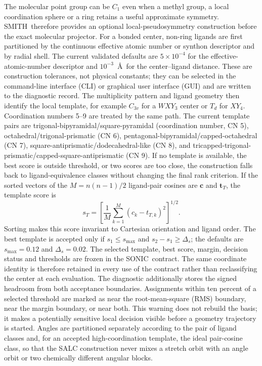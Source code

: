 \documentclass[journal=jctcce,manuscript=article,layout=traditional]{achemso}
\newcommand{\SONIC}{SONIC}
\newcommand{\SMITH}{\textsc{SMITH}}
\theoremstyle{definition}
\begin{document}
The molecular point group can be \(C_1\) even when a methyl group, a local
coordination sphere or a ring retains a useful approximate symmetry.  \SMITH\
therefore provides an optional local-pseudosymmetry construction before the
exact molecular projector.  For a bonded center, non-ring ligands are first
partitioned by the continuous effective atomic number or synthon descriptor
and by radial shell.  The current validated defaults are
\(5\times10^{-4}\) for the effective-atomic-number descriptor and
\(10^{-3}\)~\AA\ for the center--ligand distance.  These are construction
tolerances, not physical constants; they can be selected in the command-line
interface (CLI) or graphical user interface (GUI) and
are written to the diagnostic record.
The multiplicity pattern and ligand geometry then identify the local template,
for example \(C_{3v}\) for a \(WXY_3\) center or \(T_d\) for \(XY_4\).
Coordination numbers 5--9 are treated by the same path.  The current template
pairs are trigonal-bipyramidal/square-pyramidal (coordination number, CN 5),
octahedral/trigonal-prismatic (CN 6), pentagonal-bipyramidal/capped-octahedral
(CN 7), square-antiprismatic/dodecahedral-like (CN 8), and
tricapped-trigonal-prismatic/capped-square-antiprismatic (CN 9).  If no
template is available, the best score is outside threshold, or two scores are
too close, the construction falls back to ligand-equivalence classes without
changing the final rank criterion.  If the sorted vectors of the
\(M=n(n-1)/2\) ligand-pair cosines are \(\mathbf c\) and
\(\mathbf t_T\), the template score is
\begin{equation}
 s_T=\left[\frac{1}{M}\sum_{k=1}^{M}(c_k-t_{T,k})^2\right]^{1/2}.
 \label{eq:local-template-score}
\end{equation}
Sorting makes this score invariant to Cartesian orientation and ligand order.
The best template is accepted only if \(s_1\le s_{\max}\) and
\(s_2-s_1\ge\Delta_s\); the defaults are \(s_{\max}=0.12\) and
\(\Delta_s=0.02\).  The selected template, best score, margin, decision status
and thresholds are frozen in the \SONIC\ contract.  The same coordinate
identity is therefore retained in every use of the contract rather than
reclassifying the center at each evaluation.
The diagnostic additionally stores the signed headroom from both acceptance
boundaries.  Assignments within ten percent of a selected threshold are marked
as near the root-mean-square (RMS) boundary, near the margin boundary, or near
both.  This warning
does not rebuild the basis; it makes a potentially sensitive local decision
visible before a geometry trajectory is started.
Angles are partitioned separately according to the pair of ligand classes and,
for an accepted high-coordination template, the ideal pair-cosine class, so
that the SALC construction never mixes a stretch orbit with an angle orbit or
two chemically different angular blocks.
\end{document}
